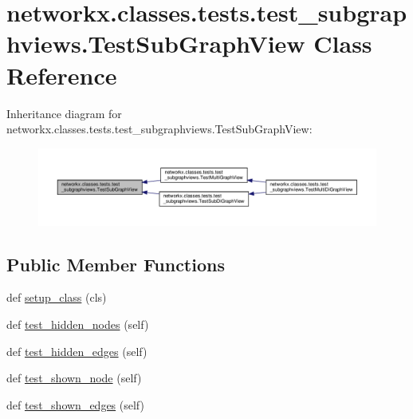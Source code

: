 \hypertarget{classnetworkx_1_1classes_1_1tests_1_1test__subgraphviews_1_1TestSubGraphView}{}\section{networkx.\+classes.\+tests.\+test\+\_\+subgraphviews.\+Test\+Sub\+Graph\+View Class Reference}
\label{classnetworkx_1_1classes_1_1tests_1_1test__subgraphviews_1_1TestSubGraphView}


Inheritance diagram for networkx.\+classes.\+tests.\+test\+\_\+subgraphviews.\+Test\+Sub\+Graph\+View\+:
\nopagebreak
\begin{figure}[H]
\begin{center}
\leavevmode
\includegraphics[width=350pt]{classnetworkx_1_1classes_1_1tests_1_1test__subgraphviews_1_1TestSubGraphView__inherit__graph}
\end{center}
\end{figure}
\subsection*{Public Member Functions}
\begin{DoxyCompactItemize}
\item 
def \hyperlink{classnetworkx_1_1classes_1_1tests_1_1test__subgraphviews_1_1TestSubGraphView_a85cf43f297be9b2deeb076a5dd1d71aa}{setup\+\_\+class} (cls)
\item 
def \hyperlink{classnetworkx_1_1classes_1_1tests_1_1test__subgraphviews_1_1TestSubGraphView_a869779c0bc1e46d290cb63860239200b}{test\+\_\+hidden\+\_\+nodes} (self)
\item 
def \hyperlink{classnetworkx_1_1classes_1_1tests_1_1test__subgraphviews_1_1TestSubGraphView_aec8235f4f86f761134eb6826626bf3b8}{test\+\_\+hidden\+\_\+edges} (self)
\item 
def \hyperlink{classnetworkx_1_1classes_1_1tests_1_1test__subgraphviews_1_1TestSubGraphView_adf85598e272500803a5c71477d789cd7}{test\+\_\+shown\+\_\+node} (self)
\item 
def \hyperlink{classnetworkx_1_1classes_1_1tests_1_1test__subgraphviews_1_1TestSubGraphView_a89de394862df16e9fb37937f06eb2d80}{test\+\_\+shown\+\_\+edges} (self)
\end{DoxyCompactItemize}
